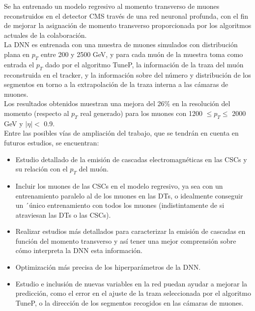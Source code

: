 Se ha entrenado un modelo regresivo al momento transverso de muones reconstruidos en el detector CMS trav\'es de una red neuronal profunda, con el fin de mejorar la asignaci\'on de momento transverso proporcionada por los algoritmos actuales de la colaboraci\'on. \\

La DNN es entrenada con una muestra de muones simulados con distribuci\'on plana en $p_{T}$ entre 200 y 2500 GeV, y para cada mu\'on de la muestra toma como entrada el $p_{T}$ dado por el algoritmo TuneP, la informaci\'on de la traza del mu\'on reconstruida en el tracker, y la informaci\'on sobre del n\'umero y distribuci\'on de los segmentos en torno a la extrapolaci\'on de la traza interna a las c\'amaras de muones. \\

Los resultados obtenidos muestran una mejora del 26\% en la resoluci\'on del momento (respecto al $p_{T}$ real generado) para los muones con 1200 $\leq p_{T} \leq$ 2000 GeV y $\lvert \eta \rvert <$ 0.9. \\

Entre las posibles v\'ias de ampliaci\'on del trabajo, que se tendr\'an en cuenta en futuros estudios, se encuentran:

\begin{itemize}
    \item Estudio detallado de la emisi\'on de cascadas electromagn\'eticas en las CSCs y su relaci\'on con el $p_{T}$ del mu\'on.
    \item Incluir los muones de las CSCs en el modelo regresivo, ya sea con un entrenamiento paralelo al de los muones en las DTs, o idealmente conseguir un ´\'unico entrenamiento con todos los muones (indistintamente de si atraviesan las DTs o las CSCs).
    \item  Realizar estudios m\'as detallados para caracterizar la emisi\'on de cascadas en funci\'on del momento transverso y as\'i tener una mejor comprensi\'on sobre c\'omo interpreta la DNN esta informaci\'on.
    \item Optimizaci\'on m\'as precisa de los hiperpar\'ametros de la DNN.
    \item Estudio e inclusi\'on de nuevas variables en la red puedan ayudar a mejorar la predicci\'on, como el error en el ajuste de la traza seleccionada por el algoritmo TuneP, o la direcci\'on de los segmentos recogidos en las c\'amaras de muones.
\end{itemize}
